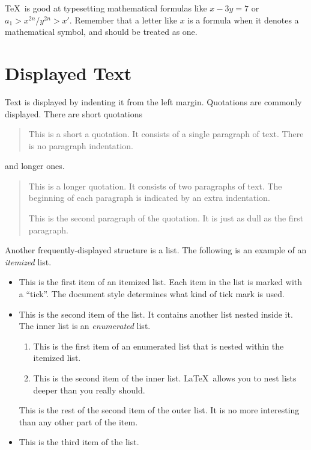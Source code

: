 \TeX\ is good at typesetting mathematical formulas like
       \( x-3y = 7 \) 
or
       \( a_{1} > x^{2n} / y^{2n} > x' \).
Remember that a letter like
       $x$        %
is a formula when it denotes a mathematical symbol, and should
be treated as one.

\section{Displayed Text}

Text is displayed by indenting it from the left margin.
Quotations are commonly displayed.  There are short quotations
\begin{quote}
   This is a short a quotation.  It consists of a 
   single paragraph of text.  There is no paragraph
   indentation.
\end{quote}
and longer ones.
\begin{quotation}
   This is a longer quotation.  It consists of two paragraphs
   of text.  The beginning of each paragraph is indicated
   by an extra indentation.

   This is the second paragraph of the quotation.  It is just
   as dull as the first paragraph.
\end{quotation}
Another frequently-displayed structure is a list.
The following is an example of an {\em itemized} list.
\begin{itemize}
   \item  This is the first item of an itemized list.  Each item 
          in the list is marked with a ``tick''.  The document
          style determines what kind of tick mark is used.

   \item  This is the second item of the list.  It contains another
          list nested inside it.  The inner list is an {\em enumerated}
          list.
          \begin{enumerate}
              \item This is the first item of an enumerated list that
                    is nested within the itemized list.

              \item This is the second item of the inner list.  \LaTeX\
                    allows you to nest lists deeper than you really should.
          \end{enumerate}
          This is the rest of the second item of the outer list.  It
          is no more interesting than any other part of the item.
   \item  This is the third item of the list.
\end{itemize}
